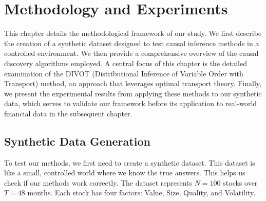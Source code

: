 \chapter{Methodology and Experiments}
\label{ch:methodology}

This chapter details the methodological framework of our study. We first describe the creation of a synthetic dataset designed to test causal inference methods in a controlled environment. We then provide a comprehensive overview of the causal discovery algorithms employed. A central focus of this chapter is the detailed examination of the DIVOT (Distributional Inference of Variable Order with Transport) method, an approach that leverages optimal transport theory. Finally, we present the experimental results from applying these methods to our synthetic data, which serves to validate our framework before its application to real-world financial data in the subsequent chapter.


\section{Synthetic Data Generation}
To test our methods, we first need to create a synthetic dataset. This dataset is like a small, controlled world where we know the true answers. This helps us check if our methods work correctly. The dataset represents $N=100$ stocks over $T=48$ months. Each stock has four factors: Value, Size, Quality, and Volatility.

